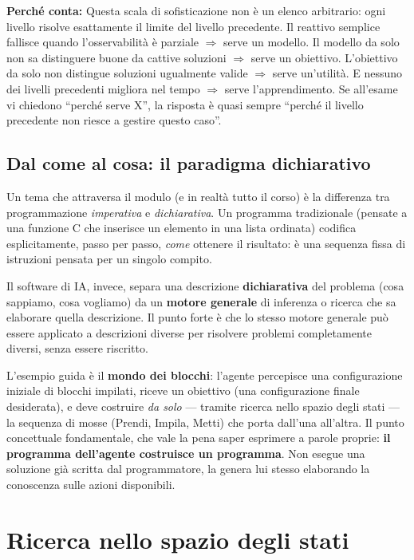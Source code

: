 \documentclass[11pt,a4paper]{article}
\newcommand{\perche}[1]{\begin{nota}\textbf{Perché conta:} #1\end{nota}}
\begin{document}
\perche{Questa scala di sofisticazione non è un elenco arbitrario: ogni livello risolve esattamente il limite del livello precedente. Il reattivo semplice fallisce quando l'osservabilità è parziale $\Rightarrow$ serve un modello. Il modello da solo non sa distinguere buone da cattive soluzioni $\Rightarrow$ serve un obiettivo. L'obiettivo da solo non distingue soluzioni ugualmente valide $\Rightarrow$ serve un'utilità. E nessuno dei livelli precedenti migliora nel tempo $\Rightarrow$ serve l'apprendimento. Se all'esame vi chiedono ``perché serve X'', la risposta è quasi sempre ``perché il livello precedente non riesce a gestire questo caso''.}

\subsection{Dal come al cosa: il paradigma dichiarativo}

Un tema che attraversa il modulo (e in realtà tutto il corso) è la differenza tra programmazione \emph{imperativa} e \emph{dichiarativa}. Un programma tradizionale (pensate a una funzione C che inserisce un elemento in una lista ordinata) codifica esplicitamente, passo per passo, \emph{come} ottenere il risultato: è una sequenza fissa di istruzioni pensata per un singolo compito.

Il software di IA, invece, separa una descrizione \textbf{dichiarativa} del problema (cosa sappiamo, cosa vogliamo) da un \textbf{motore generale} di inferenza o ricerca che sa elaborare quella descrizione. Il punto forte è che lo stesso motore generale può essere applicato a descrizioni diverse per risolvere problemi completamente diversi, senza essere riscritto.

L'esempio guida è il \textbf{mondo dei blocchi}: l'agente percepisce una configurazione iniziale di blocchi impilati, riceve un obiettivo (una configurazione finale desiderata), e deve costruire \emph{da solo} --- tramite ricerca nello spazio degli stati --- la sequenza di mosse (Prendi, Impila, Metti) che porta dall'una all'altra. Il punto concettuale fondamentale, che vale la pena saper esprimere a parole proprie: \textbf{il programma dell'agente costruisce un programma}. Non esegue una soluzione già scritta dal programmatore, la genera lui stesso elaborando la conoscenza sulle azioni disponibili.

\newpage
\section{Ricerca nello spazio degli stati}
\end{document}
